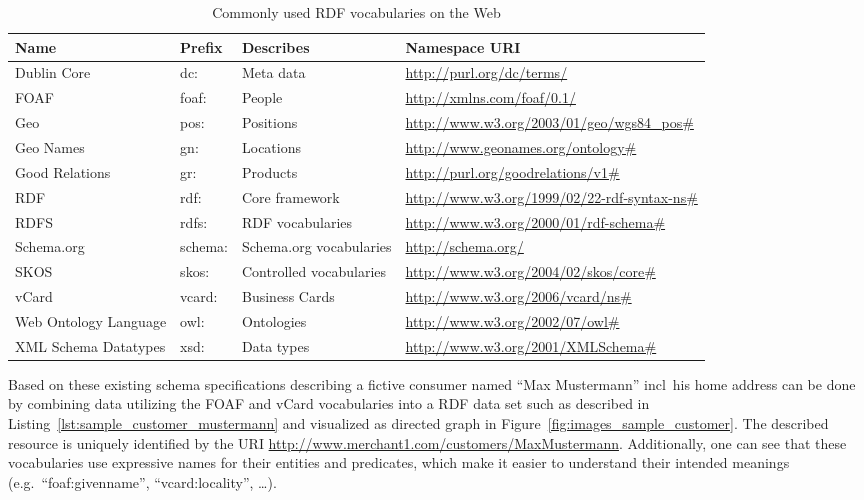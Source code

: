\begin{table}[H]
\centering
\begin{tabular}{p{3cm}llp{4.5cm}}
\hline
\textbf{Name} & \textbf{Prefix} & \textbf{Describes} & \textbf{Namespace URI} \\
\hline
Dublin Core & dc: & Meta data & \url{http://purl.org/dc/terms/} \\
\hline
FOAF & foaf: & People & \url{http://xmlns.com/foaf/0.1/} \\
\hline
Geo & pos: & Positions & \url{http://www.w3.org/2003/01/geo/wgs84\_pos\#} \\
\hline
Geo Names & gn: & Locations & \url{http://www.geonames.org/ontology\#} \\
\hline
Good Relations & gr: & Products & \url{http://purl.org/goodrelations/v1\#} \\
\hline
RDF & rdf: & Core framework & \url{http://www.w3.org/1999/02/22-rdf-syntax-ns\#} \\
\hline
RDFS & rdfs: & RDF vocabularies & \url{http://www.w3.org/2000/01/rdf-schema\#} \\
\hline
Schema.org & schema: & Schema.org vocabularies & \url{http://schema.org/} \\
\hline
SKOS & skos: & Controlled vocabularies & \url{http://www.w3.org/2004/02/skos/core\#} \\
\hline
vCard & vcard: & Business Cards & \url{http://www.w3.org/2006/vcard/ns\#} \\
\hline
Web Ontology Language & owl: & Ontologies & \url{http://www.w3.org/2002/07/owl\#} \\
\hline
XML Schema Datatypes & xsd: & Data types & \url{http://www.w3.org/2001/XMLSchema\#} \\
\hline
\end{tabular}
\caption[Commonly used \gls{RDF} vocabularies on the Web]{Commonly used \gls{RDF} vocabularies on the Web \citep[pg. 41]{wood2014linked}}
\label{tab:used_vocab_rdf}
\end{table}

Based on these existing schema specifications describing a fictive consumer named ``Max Mustermann'' \gls{incl}\ his home address can be done by combining data utilizing the \gls{FOAF} and \gls{vCard} vocabularies into a \gls{RDF} data set such as described in Listing~\ref{lst:sample_customer_mustermann} and visualized as directed graph in Figure~\ref{fig:images_sample_customer}. The described resource is uniquely identified by the \gls{URI} \url{http://www.merchant1.com/customers/MaxMustermann}. Additionally, one can see that these vocabularies use expressive names for their entities and predicates, which make it easier to understand their intended meanings (e.g.\ ``foaf:givenname'', ``vcard:locality'', \ldots).  \@

